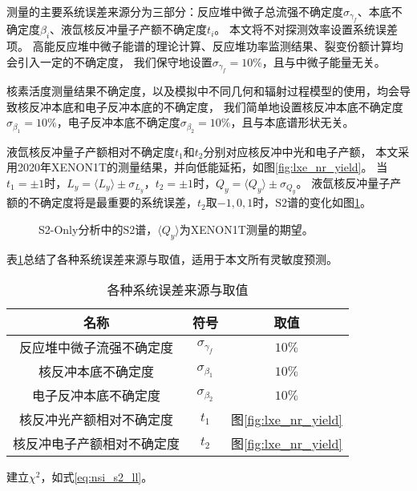 测量的主要系统误差来源分为三部分：反应堆中微子总流强不确定度$\sigma_{\gamma_f}$、本底不确定度$\beta_i$、液氙核反冲量子产额不确定度$t_i$。
本文将不对探测效率设置系统误差项。
高能反应堆中微子能谱的理论计算、反应堆功率监测结果、裂变份额计算均会引入一定的不确定度\cite{an_improved_2017}，
我们保守地设置$\sigma_{\gamma_f}=10\%$，且与中微子能量无关。

核素活度测量结果不确定度，以及模拟中不同几何和辐射过程模型的使用，均会导致核反冲本底和电子反冲本底的不确定度，
我们简单地设置核反冲本底不确定度$\sigma_{\beta_1}=10\%$，电子反冲本底不确定度$\sigma_{\beta_2}=10\%$，且与本底谱形状无关。

液氙核反冲量子产额相对不确定度$t_1$和$t_2$分别对应核反冲中光和电子产额，
本文采用2020年XENON1T的测量结果\cite{aprile_search_2021}，并向低能延拓，如图\ref{fig:lxe_nr_yield}。
当$t_1=\pm1$时，$L_y=\langle L_y\rangle\pm\sigma_{L_y}$，$t_2=\pm1$时，$Q_y=\langle Q_y\rangle\pm\sigma_{Q_y}$。
液氙核反冲量子产额的不确定度将是最重要的系统误差，$t_2$取$-1,0,1$时，$\mathrm{S2}$谱的变化如图\ref{fig:xe_rate_prediction_t2}。

\begin{figure}
  \centering
  
  \caption{\label{fig:xe_rate_prediction_t2} S2-Only分析中的$\mathrm{S2}$谱，$\langle Q_y\rangle$为XENON1T测量的期望。}
\end{figure}

表\ref{tab:sys_error}总结了各种系统误差来源与取值，适用于本文所有灵敏度预测。

\begin{table}
  \centering
  \caption{各种系统误差来源与取值}
  \begin{tabular}{ccc}
    \toprule
    名称 & 符号 & 取值 \\
    \midrule
    反应堆中微子流强不确定度 & $\sigma_{\gamma_f}$ & $10\%$ \\
    核反冲本底不确定度 & $\sigma_{\beta_1}$ & $10\%$ \\
    电子反冲本底不确定度 & $\sigma_{\beta_2}$ & $10\%$ \\
    核反冲光产额相对不确定度 & $t_1$ & 图\ref{fig:lxe_nr_yield} \\
    核反冲电子产额相对不确定度 & $t_2$ & 图\ref{fig:lxe_nr_yield} \\
    \bottomrule
  \end{tabular}
  \label{tab:sys_error}
\end{table}

建立$\chi^2$，如式\ref{eq:nsi_s2_ll}。

